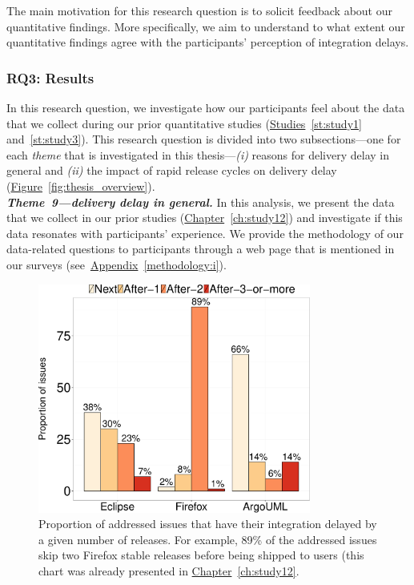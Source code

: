 {The main motivation for this research question is to solicit feedback about our
quantitative findings. More specifically, we aim to understand to what extent
our quantitative findings agree with the participants' perception of integration
delays.

\subsubsection*{RQ3: Results}

In this research question, we investigate how our participants feel about the
data that we collect during our prior quantitative studies
(\hyperref[st:study1]{Studies}~\ref{st:study1} and~\ref{st:study3}). This
research question is divided into two subsections---one for each {\em theme}
that is investigated in this thesis---{\em (i)} reasons for delivery delay in
general and {\em (ii)} the impact of rapid release cycles on delivery delay
(\hyperref[fig:thesis_overview]{Figure}~\ref{fig:thesis_overview}).\\

\noindent\textit{\textbf{Theme~9---delivery delay in general.}}
In this analysis, we present the data that we collect in our prior studies
(\hyperref[ch:study12]{Chapter}~\ref{ch:study12}) and investigate if this data
resonates with participants' experience. We provide the methodology of our
data-related questions to participants through a web page that is mentioned in
our surveys (see~\hyperref[methodology:i]{Appendix}~\ref{methodology:i}).

\begin{figure}
	\centering
	\includegraphics[width=0.80\textwidth,keepaspectratio]
	{chapters/chapter5/figures/rq6/datasets.pdf}
	\caption{Proportion of addressed issues that have their integration
		delayed by a given number of releases. For example, 89\% of the
	addressed issues skip two Firefox stable releases before being shipped
to users (this chart was already presented in
\hyperref[ch:study12]{Chapter}~\ref{ch:study12}. }
	\label{fig:data-related-rq1}
\end{figure}

}
